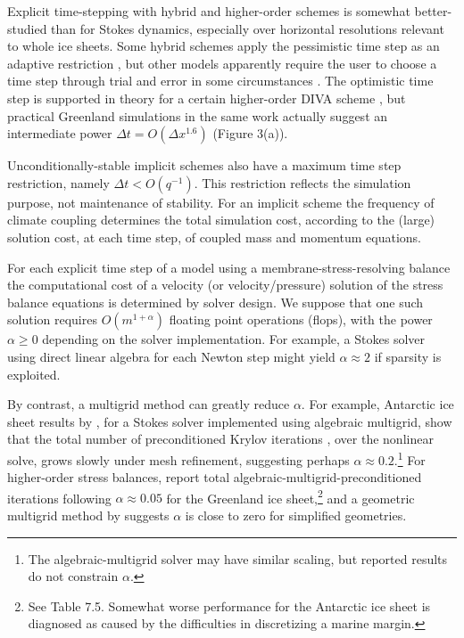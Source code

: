 \documentclass[twocolumn,letterpaper]{igs}
\begin{document}
Explicit time-stepping with hybrid and higher-order schemes is somewhat better-studied than for Stokes dynamics, especially over horizontal resolutions relevant to whole ice sheets.  Some hybrid schemes apply the pessimistic time step as an adaptive restriction \citep{Winkelmannetal2011}, but other models apparently require the user to choose a time step through trial and error in some circumstances \citep[for example]{Fischleretal2022,Robinsonetal2022}.  The optimistic time step is supported in theory for a certain higher-order DIVA scheme \citep[see equation (52)]{Robinsonetal2022}, but practical Greenland simulations in the same work actually suggest an intermediate power $\Delta t = O(\Delta x^{1.6})$ (Figure 3(a)).

Unconditionally-stable implicit schemes also have a maximum time step restriction, namely $\Delta t < O(q^{-1})$.  This restriction reflects the simulation purpose, not maintenance of stability.  For an implicit scheme the frequency of climate coupling determines the total simulation cost, according to the (large) solution cost, at each time step, of coupled mass and momentum equations.

For each explicit time step of a model using a membrane-stress-resolving balance the computational cost of a velocity (or velocity/pressure) solution of the stress balance equations is determined by solver design.  We suppose that one such solution requires $O(m^{1+\alpha})$ floating point operations (flops),  with the power $\alpha\ge 0$ depending on the solver implementation.  For example, a Stokes solver using direct linear algebra for each Newton step might yield $\alpha \approx 2$ if sparsity is exploited.


By contrast, a multigrid method \citep{Trottenbergetal2001} can greatly reduce $\alpha$.  For example, Antarctic ice sheet results by \cite[Table 8.1]{IsaacStadlerGhattas2015}, for a Stokes solver implemented using algebraic multigrid, show that the total number of preconditioned Krylov iterations \citep{Bueler2021}, over the nonlinear solve, grows slowly under mesh refinement, suggesting perhaps $\alpha\approx 0.2$.\footnote{The \cite{Lengetal2012} algebraic-multigrid solver may have similar scaling, but reported results do not constrain $\alpha$.}  For higher-order stress balances, \cite{Tuminaroetal2016} report total algebraic-multigrid-preconditioned iterations following $\alpha \approx 0.05$ for the Greenland ice sheet,\footnote{See Table 7.5.  Somewhat worse performance for the Antarctic ice sheet is diagnosed as caused by the difficulties in discretizing a marine margin.} and a geometric multigrid method by \citep{BrownSmithAhmadia2013} suggests $\alpha$ is close to zero for simplified geometries.
\end{document}
